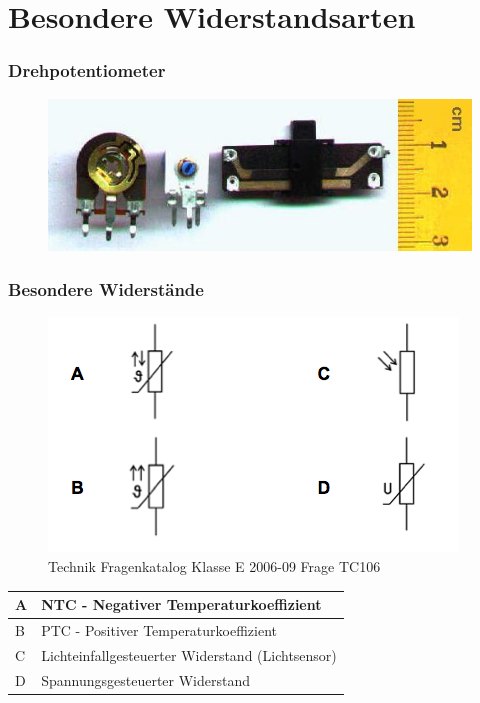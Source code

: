 \section*{Besondere Widerstandsarten}
\begin{frame}
    \frametitle{Drehpotentiometer}

    \begin{center}
      \begin{figure}
      \includegraphics[width=\textwidth,height=.75\textheight,keepaspectratio]{e04/Potenziometer.jpg}
    \end{figure}
    \end{center}
 	
\end{frame}
\begin{frame}
    \frametitle{Besondere Widerstände}

    \begin{center}
      \begin{figure}
      \includegraphics[width=.6\textwidth,height=.5\textheight,keepaspectratio]{e04/bild-TC106.png}
      \caption{Technik Fragenkatalog Klasse E 2006-09 Frage TC106}
    \end{figure}
 	
 	\begin{tabular}{l||l}\hline
        A & NTC - Negativer Temperaturkoeffizient \\ \hline
        B & PTC - Positiver Temperaturkoeffizient \\ \hline
        C & Lichteinfallgesteuerter Widerstand (Lichtsensor) \\ \hline
        D & Spannungsgesteuerter Widerstand \\ \hline
    \end{tabular}
 	    \end{center}
\end{frame}

